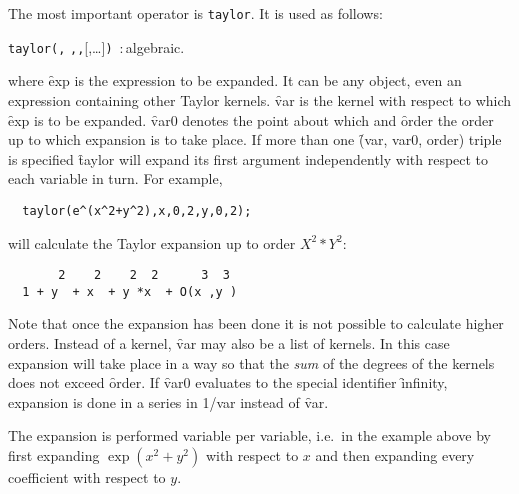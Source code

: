 

The most important operator is \texttt{taylor}.
It is used as follows:
\hypertarget{operator:TAYLOR}{}
\begin{syntax}
  \texttt{taylor(}\texttt{,}
         \texttt{,}\texttt{,}[,\ldots]\texttt{)}
         \,:\,algebraic.
\end{syntax}
where \f{exp} is the expression to be expanded. It can be any \REDUCE{}
object, even an expression containing other Taylor kernels. \f{var} is
the kernel with respect to which \f{exp} is to be expanded. \f{var0}
denotes the point about which and \f{order} the order up to which
expansion is to take place. If more than one \f{(var, var0, order)} triple
is specified \f{taylor} will expand its first argument independently
with respect to each variable in turn. For example,
\begin{verbatim}
  taylor(e^(x^2+y^2),x,0,2,y,0,2);
\end{verbatim}
will calculate the Taylor expansion up to order $X^{2}*Y^{2}$:
\begin{verbatim}
       2    2    2  2      3  3
  1 + y  + x  + y *x  + O(x ,y )
\end{verbatim}
Note that once the expansion has been done it is not possible to
calculate higher orders.
Instead of a kernel, \f{var} may also
be a list of kernels. In this case expansion will take place in a way
so that the \emph{sum} of the degrees of the kernels does not exceed
\f{order}.
If \f{var0} evaluates to the special identifier \f{infinity}, expansion is
done in a series in 1/var instead of \f{var}.

The expansion is performed variable per variable, i.e.\ in the example
above by first expanding $\exp(x^{2}+y^{2})$ with respect to $x$ and
then expanding every coefficient with respect to $y$.

